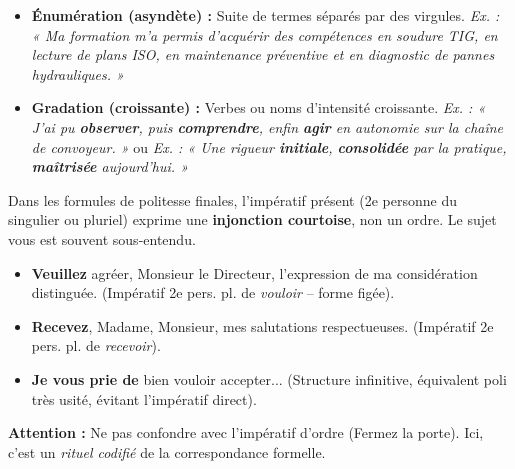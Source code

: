 \documentclass[11pt]{article}
\begin{document}
\begin{definition}
\begin{itemize}
    \item \textbf{Énumération (asyndète) :} Suite de termes séparés par des virgules. \emph{Ex. : « Ma formation m'a permis d'acquérir des compétences en soudure TIG, en lecture de plans ISO, en maintenance préventive et en diagnostic de pannes hydrauliques. »}
    \item \textbf{Gradation (croissante) :} Verbes ou noms d'intensité croissante. \emph{Ex. : « J'ai pu \textbf{observer}, puis \textbf{comprendre}, enfin \textbf{agir} en autonomie sur la chaîne de convoyeur. »} ou \emph{Ex. : « Une rigueur \textbf{initiale}, \textbf{consolidée} par la pratique, \textbf{maîtrisée} aujourd'hui. »}
\end{itemize}
\end{definition}

\begin{propriete}
Dans les formules de politesse finales, l'impératif présent (2e personne du singulier ou pluriel) exprime une \textbf{injonction courtoise}, non un ordre. Le sujet \og{}vous\fg{} est souvent sous-entendu.
\begin{itemize}
    \item \og{}\textbf{Veuillez} agréer, Monsieur le Directeur, l'expression de ma considération distinguée.\fg{} (Impératif 2e pers. pl. de \emph{vouloir} -- forme figée).
    \item \og{}\textbf{Recevez}, Madame, Monsieur, mes salutations respectueuses.\fg{} (Impératif 2e pers. pl. de \emph{recevoir}).
    \item \og{}\textbf{Je vous prie de} bien vouloir accepter...\fg{} (Structure infinitive, équivalent poli très usité, évitant l'impératif direct).
\end{itemize}
\textbf{Attention :} Ne pas confondre avec l'impératif d'ordre (\og{}Fermez la porte\fg{}). Ici, c'est un \emph{rituel codifié} de la correspondance formelle.
\end{propriete}
\end{document}
